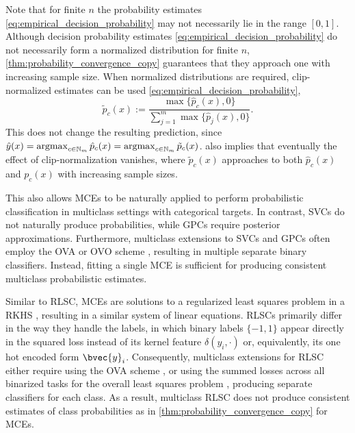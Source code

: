 \documentclass{llncs}
\newcommand{\argmax}{\operatornamewithlimits{argmax}}
\begin{document}
	Note that for finite $n$ the probability estimates \eqref{eq:empirical_decision_probability} may not necessarily lie in the range $[0,1]$. Although decision probability estimates \eqref{eq:empirical_decision_probability} do not necessarily form a normalized distribution for finite $n$, \cref{thm:probability_convergence_copy} guarantees that they approach one with increasing sample size. When normalized distributions are required, clip-normalized estimates can be used \eqref{eq:empirical_decision_probability},
	\begin{equation}
	\tilde{p}_{c}(x) := \frac{\max\{\hat{p}_{c}(x), 0\}}{\sum_{j = 1}^{m} \max\{\hat{p}_{j}(x), 0\}}.
	\label{eq:empirical_decision_probability_clip_normalized}
	\end{equation}
	This does not change the resulting prediction, since $\hat{y}(x) = \argmax_{c \in \mathbb{N}_{m}} \hat{p}_{c}(x) = \argmax_{c \in \mathbb{N}_{m}} \tilde{p}_{c}(x)$.  also implies that eventually the effect of clip-normalization vanishes, where $\tilde{p}_{c}(x)$ approaches to both $\hat{p}_{c}(x)$ and $p_{c}(x)$ with increasing sample sizes.
	
	This also allows \glspl{MCE} to be naturally applied to perform probabilistic classification in multiclass settings with categorical targets. In contrast, \glspl{SVC} do not naturally produce probabilities, while \glspl{GPC} require posterior approximations. Furthermore, multiclass extensions to \glspl{SVC} and \glspl{GPC} often employ the \gls{OVA} or \gls{OVO} scheme \citep{aly2005survey}, resulting in multiple separate binary classifiers. Instead, fitting a single \gls{MCE} is sufficient for producing consistent multiclass probabilistic estimates.
	
	Similar to \gls{RLSC}, \glspl{MCE} are solutions to a regularized least squares problem in a \gls{RKHS} \citep{lever2012conditional}, resulting in a similar system of linear equations. \glspl{RLSC} primarily differ in the way they handle the labels, in which binary labels $\{-1, 1\}$ appear directly in the squared loss instead of its kernel feature $\delta(y_{i}, \cdot)$ or, equivalently, its one hot encoded form $\bvec{y}_{i}$. Consequently, multiclass extensions for \gls{RLSC} either require using the \gls{OVA} scheme \citep{rifkin2003regularized}, or using the summed losses across all binarized tasks for the overall least squares problem \citep{pahikkala2012unsupervised}, producing separate classifiers for each class. As a result, multiclass \gls{RLSC} does not produce consistent estimates of class probabilities as in \cref{thm:probability_convergence_copy} for \glspl{MCE}.
	
\end{document}
